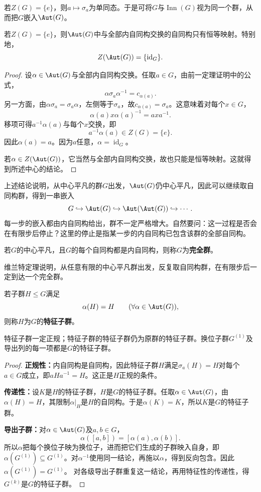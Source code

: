 若$Z(G)=\{e\}$，则$a\mapsto \sigma_a$为单同态。于是可将$G$与$\operatorname{Inn}(G)$视为同一个群，从而把$G$嵌入$\Aut(G)$。

\begin{theorem}\label{p2:aut-centerless}
若$Z(G)=\{e\}$，则$\Aut(G)$中与全部内自同构交换的自同构只有恒等映射。特别地，
\[
Z(\Aut(G))=\{\operatorname{id}_G\}.
\]
\end{theorem}
\begin{proof}
设$\alpha\in\Aut(G)$与全部内自同构交换。任取$a\in G$，由前一定理证明中的公式，
\[
\alpha \sigma_a\alpha^{-1}=c_{\alpha(a)}.
\]
另一方面，由$\alpha \sigma_a=\sigma_a\alpha$，左侧等于$\sigma_a$，故$c_{\alpha(a)}=\sigma_a$。这意味着对每个$x\in G$，
\[
\alpha(a)x\alpha(a)^{-1}=axa^{-1}.
\]
移项可得$a^{-1}\alpha(a)$与每个$x$交换，即
\[
a^{-1}\alpha(a)\in Z(G)=\{e\}.
\]
因此$\alpha(a)=a$。因为$a$任意，$\alpha=\operatorname{id}_G$。

若$\alpha\in Z(\Aut(G))$，它当然与全部内自同构交换，故也只能是恒等映射。这就得到所述中心的结论。
\end{proof}

上述结论说明，从中心平凡的群$G$出发，$\Aut(G)$仍中心平凡，因此可以继续取自同构群，得到一串嵌入
\[
G\hookrightarrow\Aut(G)\hookrightarrow\Aut(\Aut(G))\hookrightarrow\cdots.
\]
每一步的嵌入都由内自同构给出，群不一定严格增大。自然要问：这一过程是否会在有限步后停止？这里的停止是指某一步的内自同构已包含该群的全部自同构。

\begin{definition}
\label{p2:concept:c2-l885}若$G$的中心平凡，且$G$的每个自同构都是内自同构，则称$G$为\textbf{完全群}。
\end{definition}

维兰特定理说明，从任意有限的中心平凡群出发，反复取自同构群，在有限步后一定到达一个完全群。

\begin{definition}
\label{p2:concept:c2-l891}若子群$H\leq G$满足
\[
\alpha(H)=H\qquad(\forall\alpha\in\Aut(G)),
\]
则称$H$为$G$的\textbf{特征子群}。
\end{definition}

\begin{proposition}
特征子群一定正规；特征子群的特征子群仍为原群的特征子群。换位子群$G^{(1)}$及导出列的每一项都是$G$的特征子群。
\end{proposition}
\begin{proof}
\textbf{正规性：}内自同构是自同构，因此特征子群$H$满足$\sigma_a(H)=H$对每个$a\in G$成立，即$aHa^{-1}=H$。这正是$H$正规的条件。

\textbf{传递性：}设$K$是$H$的特征子群，$H$是$G$的特征子群。任取$\alpha\in\Aut(G)$，由$\alpha(H)=H$，其限制$\alpha|_H$是$H$的自同构。于是$\alpha(K)=K$，所以$K$是$G$的特征子群。

\textbf{导出子群：}对$\alpha\in\Aut(G)$及$a,b\in G$，
\[
\alpha([a,b])=[\alpha(a),\alpha(b)].
\]
所以$\alpha$把每个换位子映为换位子，进而把它们生成的子群映入自身，即$\alpha(G^{(1)})\subseteq G^{(1)}$。对$\alpha^{-1}$使用同一结论，再施以$\alpha$，得到反向包含。因此$\alpha(G^{(1)})=G^{(1)}$。
对各级导出子群重复这一结论，再用特征性的传递性，得$G^{(k)}$是$G$的特征子群。
\end{proof}

